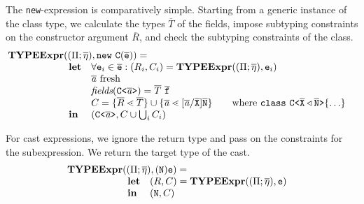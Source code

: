 \documentclass[a4paper,USenglish,cleveref, autoref, thm-restate]{lipics-v2021}
\begin{document}
The \texttt{new}-expression is comparatively simple. Starting from a
generic instance of the class type, we calculate the types $\overline
T$ of the fields, impose subtyping constraints on the constructor
argument $\overline R$, and check the subtyping  constraints of the class.
\begin{gather*}
  \begin{array}{@{}l@{}l}
    \typeExpr &(({\mtypeEnvironment} ; 
                \overline{\localVarAssumption}), \mathtt{new }\ \texttt{C}(\ol{e}) ) = \\
              &\begin{array}{ll}
                 \textbf{let} %
                 & \forall \texttt{e}_i \in \overline{\texttt{e}} : (R_i, \consSet_i) = \typeExpr(({\mtypeEnvironment} ;
                   \overline{\localVarAssumption}), \texttt{e}_i)  \\
                 & \overline{\tv{a}} \text{ fresh} \\
                 & \textit{fields} (\exptype{C}{\overline{\tv{a}}}) = \overline{T}\ \ol{f} \\
                 & \consSet = \set{\overline{R} \lessdot \overline{T}}
                   \cup \set{\overline{\tv{a}} \lessdot
                   [\overline{\tv{a}}/\ol{X}]\ol{N}} 
                   \qquad\text{where}\ \texttt{class}\ \exptype{C}{\ol{X} \triangleleft \ol{N}} \set{\ldots} \\
                 \mathbf{in}& (\exptype{C}{\ol{\tv{a}}}, \consSet \cup \bigcup_i \consSet_i)
               \end{array}
  \end{array}
\end{gather*}

For cast expressions, we ignore the return type and pass on the
constraints for the subexpression. We return the target type of the cast.
\begin{gather*}
  \begin{array}{@{}l@{}l}
    \typeExpr &(({\mtypeEnvironment} ;
                \overline{\localVarAssumption}), (\texttt{N})\mv{e} ) = \\
              &\begin{array}{ll}
                 \textbf{let} %
                 & (R, \consSet) = \typeExpr(({\mtypeEnvironment} ;
                   \overline{\localVarAssumption}), \texttt{e})  \\
                 \mathbf{in} & (\mv{N}, \consSet)
               \end{array}
  \end{array}
\end{gather*}
\end{document}
